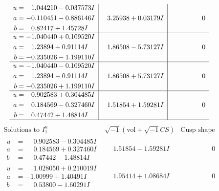 \documentclass[1p]{elsarticle_modified}
\theoremstyle{definition}
\newcommand{\I}{\sqrt{-1}}
\begin{document}
$$\begin{array}{c|c|c}
\begin{aligned}
u &= \phantom{-}1.044210 - 0.037573 I \\
a &= -0.110451 - 0.886146 I \\
b &= \phantom{-}0.82417 + 1.45728 I\end{aligned}
 & \phantom{-}3.25938 + 0.03179 I & \phantom{-0.000000 } 0 \\ \hline\begin{aligned}
u &= -1.040440 + 0.109520 I \\
a &= \phantom{-}1.23894 + 0.91114 I \\
b &= -0.235026 - 1.199110 I\end{aligned}
 & \phantom{-}1.86508 - 5.73127 I & \phantom{-0.000000 } 0 \\ \hline\begin{aligned}
u &= -1.040440 - 0.109520 I \\
a &= \phantom{-}1.23894 - 0.91114 I \\
b &= -0.235026 + 1.199110 I\end{aligned}
 & \phantom{-}1.86508 + 5.73127 I & \phantom{-0.000000 } 0 \\ \hline\begin{aligned}
u &= \phantom{-}0.902583 + 0.304485 I \\
a &= \phantom{-}0.184569 - 0.327460 I \\
b &= \phantom{-}0.47442 + 1.48814 I\end{aligned}
 & \phantom{-}1.51854 + 1.59281 I & \phantom{-0.000000 } 0\\
 \hline 
 \end{array}$$\newpage$$\begin{array}{c|c|c}  
\text{Solutions to }I^u_{1}& \I (\text{vol} + \sqrt{-1}CS) & \text{Cusp shape}\\
 \hline 
\begin{aligned}
u &= \phantom{-}0.902583 - 0.304485 I \\
a &= \phantom{-}0.184569 + 0.327460 I \\
b &= \phantom{-}0.47442 - 1.48814 I\end{aligned}
 & \phantom{-}1.51854 - 1.59281 I & \phantom{-0.000000 } 0 \\ \hline\begin{aligned}
u &= \phantom{-}1.028050 + 0.210019 I \\
a &= -1.00999 + 1.40491 I \\
b &= \phantom{-}0.53800 - 1.60291 I\end{aligned}
 & \phantom{-}1.95414 + 1.08684 I & \phantom{-0.000000 } 0 \\ \hline\begin{aligned}

\end{aligned}
\end{array}$$
\end{document}
